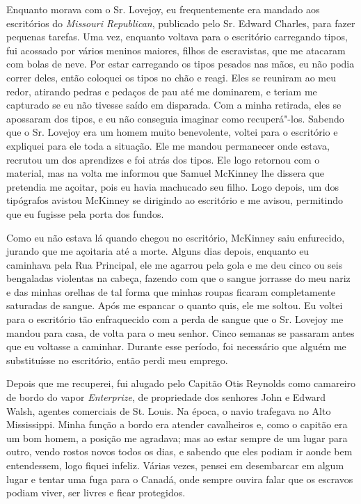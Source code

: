 Enquanto morava com o Sr. Lovejoy, eu frequentemente era mandado aos
escritórios do \emph{Missouri Republican}, publicado pelo Sr. Edward
Charles, para fazer pequenas tarefas. Uma vez, enquanto voltava para o
escritório carregando tipos, fui acossado por vários meninos maiores,
filhos de escravistas, que me atacaram com bolas de neve. Por estar
carregando os tipos pesados nas mãos, eu não podia correr deles, então
coloquei os tipos no chão e reagi. Eles se reuniram ao meu redor,
atirando pedras e pedaços de pau até me dominarem, e teriam me capturado
se eu não tivesse saído em disparada. Com a minha retirada, eles se
apossaram dos tipos, e eu não conseguia imaginar como recuperá"-los.
Sabendo que o Sr. Lovejoy era um homem muito benevolente, voltei para o
escritório e expliquei para ele toda a situação. Ele me mandou
permanecer onde estava, recrutou um dos aprendizes e foi atrás dos
tipos. Ele logo retornou com o material, mas na volta me informou que
Samuel McKinney lhe dissera que pretendia me açoitar, pois eu havia
machucado seu filho. Logo depois, um dos tipógrafos avistou McKinney se
dirigindo ao escritório e me avisou, permitindo que eu fugisse pela
porta dos fundos.

Como eu não estava lá quando chegou no escritório, McKinney saiu
enfurecido, jurando que me açoitaria até a morte. Alguns dias depois,
enquanto eu caminhava pela Rua Principal, ele me agarrou pela gola e me
deu cinco ou seis bengaladas violentas na cabeça, fazendo com que o
sangue jorrasse do meu nariz e das minhas orelhas de tal forma que
minhas roupas ficaram completamente saturadas de sangue. Após me
espancar o quanto quis, ele me soltou. Eu voltei para o escritório tão
enfraquecido com a perda de sangue que o Sr. Lovejoy me mandou para
casa, de volta para o meu senhor. Cinco semanas se passaram antes que eu
voltasse a caminhar. Durante esse período, foi necessário que alguém me
substituísse no escritório, então perdi meu emprego.

Depois que me recuperei, fui alugado pelo Capitão Otis Reynolds como
camareiro de bordo do vapor \emph{Enterprize}, de propriedade dos
senhores John e Edward Walsh, agentes comerciais de St. Louis. Na época,
o navio trafegava no Alto Mississippi. Minha função a bordo era atender
cavalheiros e, como o capitão era um bom homem, a posição me agradava;
mas ao estar sempre de um lugar para outro, vendo rostos novos todos os
dias, e sabendo que eles podiam ir aonde bem entendessem, logo fiquei
infeliz. Várias vezes, pensei em desembarcar em algum lugar e tentar uma
fuga para o Canadá, onde sempre ouvira falar que os escravos podiam
viver, ser livres e ficar protegidos.

